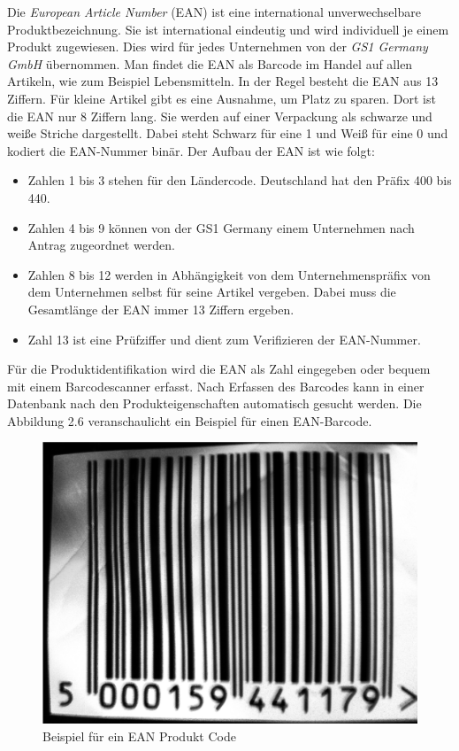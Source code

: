 Die \emph{European Article Number\cite{EAN:01, EAN:02}} (EAN) ist eine international unverwechselbare Produktbezeichnung.
Sie ist international eindeutig und wird individuell je einem Produkt zugewiesen.
Dies wird f\"ur jedes Unternehmen von der \emph{GS1 Germany GmbH} \"ubernommen.
Man findet die EAN als Barcode im Handel auf allen Artikeln, wie zum Beispiel Lebensmitteln.
In der Regel besteht die EAN aus 13 Ziffern.
F\"ur kleine Artikel gibt es eine Ausnahme, um Platz zu sparen.
Dort ist die EAN nur 8 Ziffern lang.
Sie werden auf einer Verpackung als schwarze und wei\ss{}e Striche dargestellt.
Dabei steht Schwarz f\"ur eine 1 und Wei\ss{} f\"ur eine 0 und kodiert die EAN-Nummer bin\"ar.
Der Aufbau der EAN ist wie folgt:
\begin{itemize}
 \item Zahlen 1 bis 3 stehen f\"ur den L\"andercode. Deutschland hat den Pr\"afix 400 bis 440.
 \item Zahlen 4 bis 9 k\"onnen von der GS1 Germany einem Unternehmen nach Antrag zugeordnet werden.
 \item Zahlen 8 bis 12 werden in Abh\"angigkeit von dem Unternehmenspr\"afix von dem Unternehmen selbst f\"ur seine Artikel vergeben.
 Dabei muss die Gesamtl\"ange der EAN immer 13 Ziffern ergeben.
 \item Zahl 13 ist eine Pr\"ufziffer und dient zum Verifizieren der EAN-Nummer.
\end{itemize}

F\"ur die Produktidentifikation wird die EAN als Zahl eingegeben oder bequem mit einem Barcodescanner erfasst.
Nach Erfassen des Barcodes kann in einer Datenbank nach den Produkteigenschaften automatisch gesucht werden.
Die Abbildung 2.6 veranschaulicht ein Beispiel f\"ur einen EAN-Barcode.\\

\begin{figure}[h]
  \centering
  \includegraphics[scale=0.07]{fotos/extras/ean-code.jpg}
  \caption{Beispiel f\"ur ein EAN Produkt Code}
 
\end{figure}

